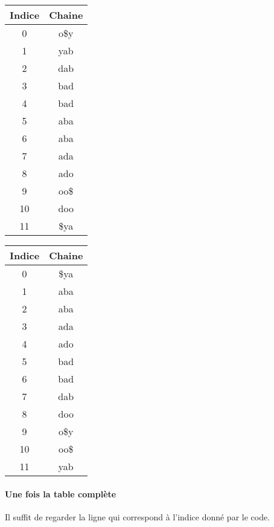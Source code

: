 \begin{tabular}{|c|c|}
    \hline
    Indice & Chaine \\
    \hline
    0 & o\$y\\
    \hline
    1 & yab   \\
    \hline
    2 & dab \\
    \hline
    3 & bad\\
    \hline
    4 & bad\\
    \hline
    5 & aba\\
    \hline
    6 & aba\\
    \hline
    7 & ada\\
    \hline
    8 & ado\\
    \hline
    9 & oo\$\\
    \hline
    10 & doo\\
    \hline
    11 & \$ya\\
    \hline
\end{tabular}

\begin{tabular}{|c|c|}
    \hline
    Indice & Chaine \\
    \hline
    0 & \$ya\\
    \hline
    1 & aba   \\
    \hline
    2 & aba \\
    \hline
    3 & ada\\
    \hline
    4 & ado\\
    \hline
    5 & bad\\
    \hline
    6 & bad\\
    \hline
    7 & dab\\
    \hline
    8 & doo\\
    \hline
    9 & o\$y\\
    \hline
    10 & oo\$\\
    \hline
    11 & yab\\
    \hline
\end{tabular}

\paragraph{Une fois la table complète}

\par Il suffit de regarder la ligne qui correspond à l'indice donné par le code.



